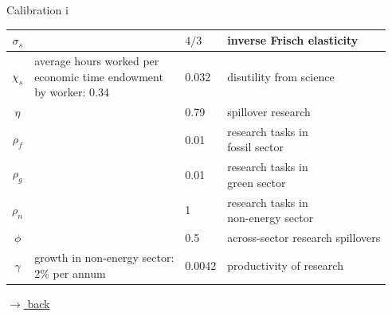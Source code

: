 \documentclass[11pt,aspectratio=169]{beamer}
\begin{document}
\begin{frame}{Calibration i}
\begin{center}
{\begin{tabular}{c|lll}
				\hline
				$\sigma_s$ &  \makecell[l]{\cite{Chetty2011AreMargins}}& $4/3$ & inverse Frisch elasticity  \\
				\hline
				$\chi_s$ &\makecell[l]{average hours worked per \\ economic time endowment\\ by worker: 0.34 \cite{OECDHoursworked}} & 0.032 & disutility from science\\
				\hline
				$\eta$ &\makecell[l]{\cite{Fried2018ClimateAnalysis}} & 0.79 & spillover research\\
				\hline			
				$\rho_f$ &\makecell[l]{\cite{Fried2018ClimateAnalysis}} & 0.01 &\makecell[l]{research tasks in\\ fossil sector}\\
				\hline			
				$\rho_g$ &\makecell[l]{\cite{Fried2018ClimateAnalysis}} & 0.01 &\makecell[l]{research tasks in\\ green sector}\\
				\hline			
				$\rho_n$ &\makecell[l]{\cite{Fried2018ClimateAnalysis}} & 1 &\makecell[l]{research tasks in \\non-energy sector}\\
				\hline			
				$\phi$ &\makecell[l]{\cite{Fried2018ClimateAnalysis}} & 0.5 &across-sector research spillovers\\
				\hline
				$\gamma$ &\makecell[l]{growth in non-energy sector:\\2\% per annum \cite{Fried2018ClimateAnalysis}} & 0.0042 & productivity of research\\
				\hline
				\hline
			\end{tabular}		
		}
	\end{center}
	\vspace{-8mm}
	\hfill
	\hyperlink{resback}{\tiny{$\rightarrow$ back}}
\end{frame}
\end{document}
